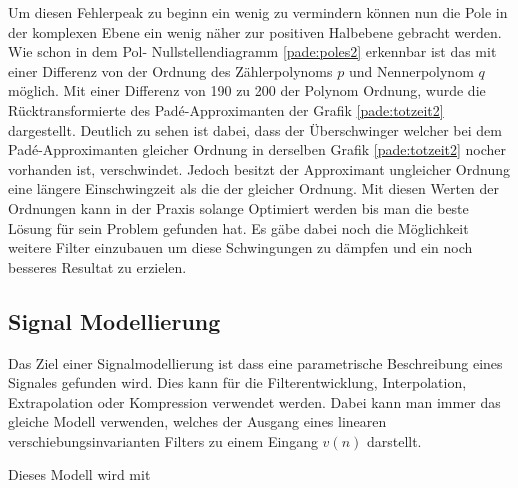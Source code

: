 Um diesen Fehlerpeak zu beginn ein wenig zu vermindern können nun die Pole in der komplexen Ebene ein wenig näher zur positiven Halbebene gebracht werden.
Wie schon in  dem Pol- Nullstellendiagramm \ref{pade:poles2} erkennbar ist das mit einer Differenz von der Ordnung des Zählerpolynoms $p$ und Nennerpolynom $q$ möglich.
Mit einer Differenz von 190 zu 200 der Polynom Ordnung, wurde die Rücktransformierte des Padé-Approximanten der Grafik \ref{pade:totzeit2} dargestellt.
Deutlich zu sehen ist dabei, dass der Überschwinger welcher bei dem Padé-Approximanten gleicher Ordnung in derselben Grafik \ref{pade:totzeit2} nocher vorhanden ist, verschwindet.
Jedoch besitzt der Approximant ungleicher Ordnung eine längere Einschwingzeit als die der gleicher Ordnung. 
Mit diesen Werten der Ordnungen kann in der Praxis solange Optimiert werden bis man die beste Lösung für sein Problem gefunden hat.
Es gäbe dabei noch die Möglichkeit weitere Filter einzubauen um diese Schwingungen zu dämpfen und ein noch besseres Resultat zu erzielen.


\newpage

\subsection{Signal Modellierung
	\label{pade:subsection:SignalMod}}

Das Ziel einer Signalmodellierung ist dass eine parametrische Beschreibung eines Signales gefunden wird.
Dies kann für die Filterentwicklung, Interpolation, Extrapolation oder Kompression verwendet werden.
Dabei kann man immer das gleiche Modell verwenden, welches der Ausgang eines linearen verschiebungsinvarianten Filters zu einem Eingang $v(n)$ darstellt. 
\begin{center}
\end{center}
Dieses Modell wird mit


